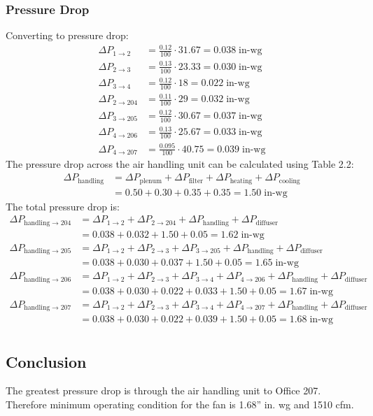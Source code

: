 \subsubsection{Pressure Drop}
Converting to pressure drop:
\begin{align*}
    \Delta P_{1\to2} &= \frac{0.12}{100} \cdot 31.67 = 0.038\; \text{in-wg} \\
    \Delta P_{2\to3} &= \frac{0.13}{100} \cdot 23.33 = 0.030\; \text{in-wg} \\
    \Delta P_{3\to4} &= \frac{0.12}{100} \cdot 18 = 0.022\; \text{in-wg} \\
    \Delta P_{2\to204} &= \frac{0.11}{100} \cdot 29 = 0.032\; \text{in-wg} \\
    \Delta P_{3\to205} &= \frac{0.12}{100} \cdot 30.67 = 0.037\; \text{in-wg} \\
    \Delta P_{4\to206} &= \frac{0.13}{100} \cdot 25.67 = 0.033\; \text{in-wg} \\
    \Delta P_{4\to207} &= \frac{0.095}{100} \cdot 40.75 = 0.039\; \text{in-wg} 
\end{align*}
The pressure drop across the air handling unit can be calculated using Table 2.2:
\begin{align*}
    \Delta P_{\text{handling}} &=  \Delta P_{\text{plenum}} + \Delta P_{\text{filter}} + \Delta P_{\text{heating}} + \Delta P_{\text{cooling}} \\
    &= 0.50 + 0.30 + 0.35 + 0.35 = 1.50 \; \text{in-wg}
\end{align*}
The total pressure drop is:
\begin{align*}
    \Delta P_{\text{handling} \to 204} &= \Delta P_{1\to2} + \Delta P_{2\to204} + \Delta P_{\text{handling}} + \Delta P_{\text{diffuser}} \\
    &= 0.038 + 0.032 + 1.50 + 0.05 = 1.62 \; \text{in-wg} \\
    \Delta P_{\text{handling} \to 205} &= \Delta P_{1\to2} + \Delta P_{2\to3} + \Delta P_{3\to205} + \Delta P_{\text{handling}} + \Delta P_{\text{diffuser}} \\
    &= 0.038 + 0.030 + 0.037 + 1.50 + 0.05 = 1.65 \; \text{in-wg} \\
    \Delta P_{\text{handling} \to 206} &= \Delta P_{1\to2} + \Delta P_{2\to3} + \Delta P_{3\to4} + \Delta P_{4\to206} + \Delta P_{\text{handling}} + \Delta P_{\text{diffuser}} \\
    &= 0.038 + 0.030 + 0.022 + 0.033 + 1.50 + 0.05 = 1.67 \; \text{in-wg} \\
    \Delta P_{\text{handling} \to 207} &= \Delta P_{1\to2} + \Delta P_{2\to3} + \Delta P_{3\to4} + \Delta P_{4\to207} + \Delta P_{\text{handling}} + \Delta P_{\text{diffuser}} \\
    &= 0.038 + 0.030 + 0.022 + 0.039 + 1.50 + 0.05 = 1.68 \; \text{in-wg} \\
\end{align*}
\subsection{Conclusion}
The greatest pressure drop is through the air handling unit to Office 207. Therefore minimum operating condition for the fan is 1.68'' in. wg and 1510 cfm. 
\newpage